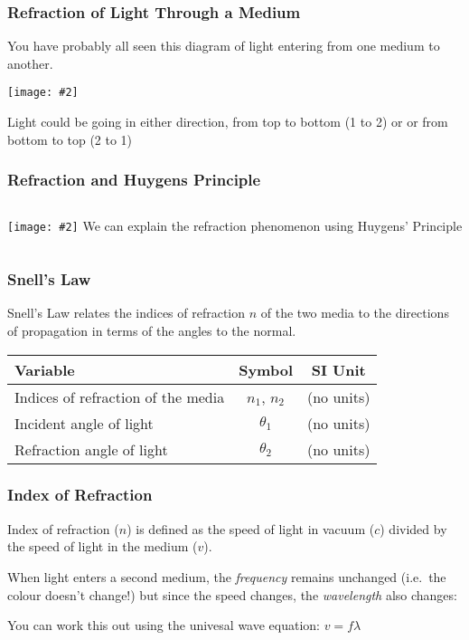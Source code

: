 \documentclass[compress,aspectratio=169]{beamer}
\newcommand{\pic}[2]{\texttt{[image: \#2]}}
\newcommand{\eq}[2]{\vspace{#1}{\LARGE\begin{displaymath}#2\end{displaymath}}}
\begin{document}
\begin{frame}
  \frametitle{Refraction of Light Through a Medium}
    You have probably all seen this diagram of light entering from one medium
    to another.
    \begin{center}
      \pic{0.35}{graphics/snell.png}
    \end{center}
    Light could be going in either direction, from top to bottom (1 to 2) or
    or from bottom to top (2 to 1)
\end{frame}


\begin{frame}
  \frametitle{Refraction and Huygens Principle}
  \begin{columns}
    \pic{1}{graphics/huygen.png}
    We can explain the refraction phenomenon using Huygens' Principle
  \end{columns}
\end{frame}


\begin{frame}
  \frametitle{Snell's Law}
  Snell's Law relates the indices of refraction $n$ of the two media to the
  directions of propagation in terms of the angles to the normal. 

  \eq{-.2in}{
    \boxed{n_1\sin\theta_1=n_2\sin\theta_2}
  }
  
  \vspace{0.1in}
  \begin{center}
    \begin{tabular}{l|c|c}
      \rowcolor{pink}
      \textbf{Variable} & \textbf{Symbol} & \textbf{SI Unit}\\ \hline
      Indices of refraction of the media & $n_1$, $n_2$ & (no units)\\
      Incident angle of light   & $\theta_1$ & (no units)\\
      Refraction angle of light & $\theta_2$ & (no units)
    \end{tabular}
  \end{center}
\end{frame}


\begin{frame}
  \frametitle{Index of Refraction}
  Index of refraction ($n$) is defined as the speed of light in vacuum ($c$)
  divided by the speed of light in the medium ($v$).

  \eq{-.3in}{
    \boxed{n=\frac{c}{v}}
  }
    
  When light enters a second medium, the \emph{frequency} remains unchanged
  (i.e.\ the colour doesn't change!) but since the speed changes, the
  \emph{wavelength} also changes:
    
  \eq{-.2in}{
    \boxed{\frac{n_1}{n_2}=\frac{\lambda_2}{\lambda_1}}
  }
  
  You can work this out using the univesal wave equation: $v=f\lambda$
\end{frame}
\end{document}

